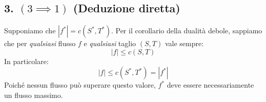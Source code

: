 \subsection*{3. $(3 \implies 1)$ (Deduzione diretta)}
Supponiamo che $|f^*| = c(S^*, T^*)$.
Per il corollario della dualità debole, sappiamo che per \textit{qualsiasi} flusso $f$ e \textit{qualsiasi} taglio $(S, T)$ vale sempre:
\[ |f| \le c(S, T) \]
In particolare:
\[ |f| \le c(S^*, T^*) = |f^*| \]
Poiché nessun flusso può superare questo valore, $f^*$ deve essere necessariamente un flusso massimo. 
